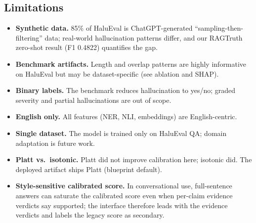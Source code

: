 \subsection{Limitations}

\begin{itemize}
    \item \textbf{Synthetic data.} 85\% of HaluEval is ChatGPT-generated ``sampling-then-filtering'' data; real-world hallucination patterns differ, and our RAGTruth zero-shot result (F1 0.4822) quantifies the gap.
    \item \textbf{Benchmark artifacts.} Length and overlap patterns are highly informative on HaluEval but may be dataset-specific (see ablation and SHAP).
    \item \textbf{Binary labels.} The benchmark reduces hallucination to yes/no; graded severity and partial hallucinations are out of scope.
    \item \textbf{English only.} All features (NER, NLI, embeddings) are English-centric.
    \item \textbf{Single dataset.} The model is trained only on HaluEval QA; domain adaptation is future work.
    \item \textbf{Platt vs.\ isotonic.} Platt did not improve calibration here; isotonic did. The deployed artifact ships Platt (blueprint default).
    \item \textbf{Style-sensitive calibrated score.} In conversational use, full-sentence answers can saturate the calibrated score even when per-claim evidence verdicts say supported; the interface therefore leads with the evidence verdicts and labels the legacy score as secondary.
\end{itemize}
